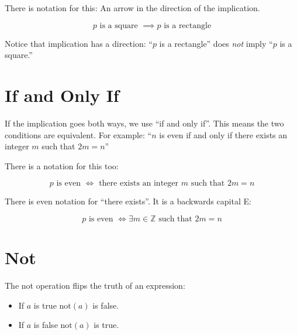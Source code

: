 There is notation for this: An arrow in the direction of the implication.

$$p \text{ is a square } \implies p \text{ is a rectangle}$$

Notice that implication has a direction: ``$p$ is a rectangle'' does \textit{not} imply 
``$p$ is a square.''

\section {If and Only If}

If the implication goes both ways, we use ``if and only if''.  This
means the two conditions are equivalent.  For example: ``$n$ is even
if and only if there exists an integer $m$ such that $2m = n$''

There is a notation for this too:

$$p \text{ is even } \iff \text{ there exists an integer } m \text{ such that } 2m = n$$

There is even notation for ``there exists''. It is a backwards capital E:

$$p \text{ is even } \iff \exists m \in \mathbb{Z}  \text{ such that } 2m = n$$


\section {Not}

The not operation flips the truth of an expression:
\begin{itemize}
\item If $a$ is true $\text{not}(a)$ is false.

\item If $a$ is false $\text{not}(a)$ is true.
\end{itemize}


